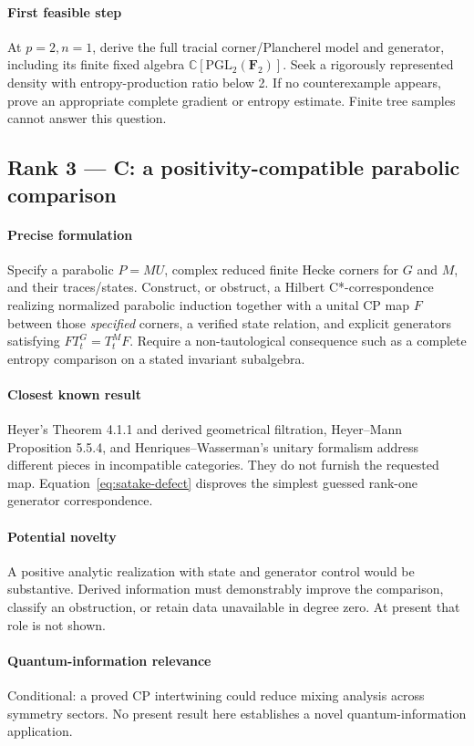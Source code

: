 \documentclass[11pt]{article}
\theoremstyle{remark}\newtheorem{remark}[definition]{Remark}
\newcommand{\C}{\mathbb{C}}
\begin{document}
\paragraph{First feasible step} At $p=2,n=1$, derive the full tracial
corner/Plancherel model and generator, including its finite fixed algebra
$\C[\mathrm{PGL}_2(\mathbf F_2)]$. Seek a rigorously represented density
with entropy-production ratio below 2. If no counterexample appears, prove
an appropriate complete gradient or entropy estimate. Finite tree samples
cannot answer this question.

\subsection{Rank 3 --- C: a positivity-compatible parabolic comparison}
\paragraph{Precise formulation} Specify a parabolic $P=MU$, complex
reduced finite Hecke corners for $G$ and $M$, and their traces/states.
Construct, or obstruct, a Hilbert C*-correspondence realizing normalized
parabolic induction together with a unital CP map $F$ between those
\emph{specified} corners, a verified state relation, and explicit generators
satisfying $F T_t^G=T_t^M F$. Require a non-tautological consequence such
as a complete entropy comparison on a stated invariant subalgebra.
\paragraph{Closest known result} Heyer's Theorem 4.1.1 and derived
geometrical filtration, Heyer--Mann Proposition 5.5.4, and
Henriques--Wasserman's unitary formalism address different pieces in
incompatible categories. They do not furnish the requested map.
Equation~\eqref{eq:satake-defect} disproves the simplest guessed
rank-one generator correspondence.
\paragraph{Potential novelty} A positive analytic realization with
state and generator control would be substantive. Derived information
must demonstrably improve the comparison, classify an obstruction, or
retain data unavailable in degree zero. At present that role is not shown.
\paragraph{Quantum-information relevance} Conditional: a proved CP
intertwining could reduce mixing analysis across symmetry sectors.
No present result here establishes a novel quantum-information application.
\end{document}
